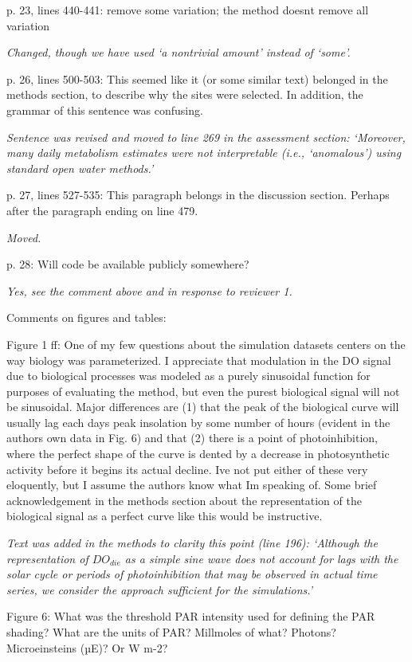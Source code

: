\documentclass[letterpaper,12pt]{article}\usepackage[]{graphicx}\usepackage[]{color}
\begin{document}
p. 23, lines 440-441: remove some variation; the method doesnt remove all variation

{\it Changed, though we have used `a nontrivial amount' instead of `some'.}

p. 26, lines 500-503: This seemed like it (or some similar text) belonged in the methods section, to describe why the sites were selected. In addition, the grammar of this sentence was confusing.

{\it Sentence was revised and moved to line 269 in the assessment section: `Moreover, many daily metabolism estimates were not interpretable (i.e., `anomalous') using standard open water methods.'
}

p. 27, lines 527-535: This paragraph belongs in the discussion section. Perhaps after the paragraph ending on line 479.

{\it Moved.} 

p. 28: Will code be available publicly somewhere?

{\it Yes, see the comment above and in response to reviewer 1.}

Comments on figures and tables:

Figure 1 ff: One of my few questions about the simulation datasets centers on the way biology was parameterized. I appreciate that modulation in the DO signal due to biological processes was modeled as a purely sinusoidal function for purposes of evaluating the method, but even the purest biological signal will not be sinusoidal. Major differences are (1) that the peak of the biological curve will usually lag each days peak insolation by some number of hours (evident in the authors own data in Fig. 6) and that (2) there is a point of photoinhibition, where the perfect shape of the curve is dented by a decrease in photosynthetic activity before it begins its actual decline. Ive not put either of these very eloquently, but I assume the authors know what Im speaking of. Some brief acknowledgement in the methods section about the representation of the biological signal as a perfect curve like this would be instructive.

{\it Text was added in the methods to clarity this point (line 196): `Although the representation of $DO_{die}$ as a simple sine wave does not account for lags with the solar cycle or periods of photoinhibition that may be observed in actual time series, we consider the approach sufficient for the simulations.'}

Figure 6: What was the threshold PAR intensity used for defining the PAR shading? What are the units of PAR? Millmoles of what? Photons? Microeinsteins (µE)? Or W m-2?
\end{document}
